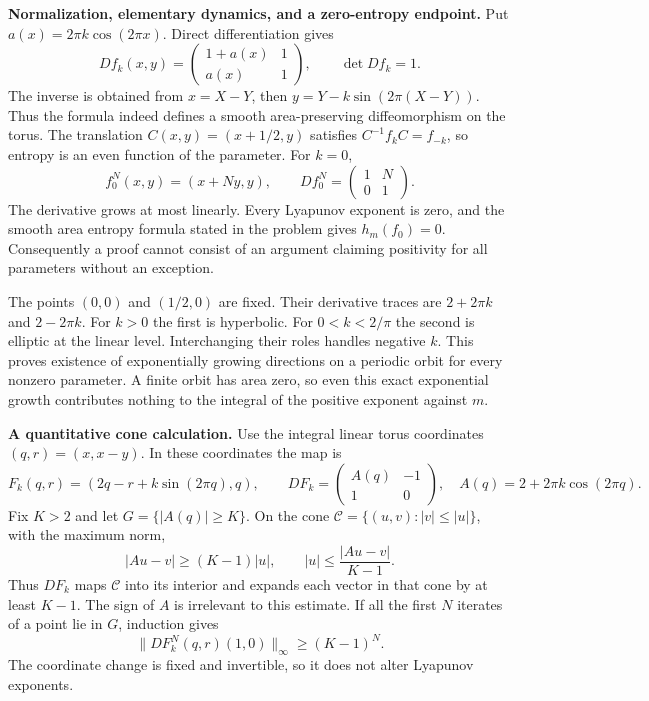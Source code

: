 \documentclass[11pt]{article}
\begin{document}
\textbf{Normalization, elementary dynamics, and a zero-entropy endpoint.}
Put $a(x)=2\pi k\cos(2\pi x)$.  Direct differentiation gives
\[
 Df_k(x,y)=\begin{pmatrix}1+a(x)&1\\a(x)&1\end{pmatrix},\qquad
 \det Df_k=1.
\]
The inverse is obtained from $x=X-Y$, then
$y=Y-k\sin(2\pi(X-Y))$.  Thus the formula indeed defines a smooth area-preserving
diffeomorphism on the torus.  The translation $C(x,y)=(x+1/2,y)$ satisfies
$C^{-1}f_kC=f_{-k}$, so entropy is an even function of the parameter.
For $k=0$,
\[
 f_0^N(x,y)=(x+Ny,y),\qquad Df_0^N=\begin{pmatrix}1&N\\0&1\end{pmatrix}.
\]
The derivative grows at most linearly.  Every Lyapunov exponent is zero,
and the smooth area entropy formula stated in the problem gives $h_m(f_0)=0$.
Consequently a proof cannot consist of an argument claiming positivity for
all parameters without an exception.

The points $(0,0)$ and $(1/2,0)$ are fixed.  Their derivative traces are
$2+2\pi k$ and $2-2\pi k$.  For $k>0$ the first is hyperbolic.  For
$0<k<2/\pi$ the second is elliptic at the linear level.  Interchanging their
roles handles negative $k$.  This proves existence of exponentially growing
directions on a periodic orbit for every nonzero parameter.  A finite orbit
has area zero, so even this exact exponential growth contributes nothing to
the integral of the positive exponent against $m$.

\textbf{A quantitative cone calculation.}
Use the integral linear torus coordinates $(q,r)=(x,x-y)$.  In these coordinates
the map is
\[
 F_k(q,r)=(2q-r+k\sin(2\pi q),q),\qquad
 DF_k=\begin{pmatrix}A(q)&-1\\1&0\end{pmatrix},\quad
 A(q)=2+2\pi k\cos(2\pi q).
\]
Fix $K>2$ and let $G=\{|A(q)|\geq K\}$.  On the cone
$\mathcal C=\{(u,v):|v|\leq|u|\}$, with the maximum norm,
\[
 |Au-v|\geq (K-1)|u|,
 \qquad |u|\leq\frac{|Au-v|}{K-1}.
\]
Thus $DF_k$ maps $\mathcal C$ into its interior and expands each vector in
that cone by at least $K-1$.  The sign of $A$ is irrelevant to this estimate.
If all the first $N$ iterates of a point lie in $G$, induction gives
\[
 \|DF_k^N(q,r)(1,0)\|_\infty\geq(K-1)^N.
\]
The coordinate change is fixed and invertible, so it does not alter Lyapunov
exponents.
\end{document}
